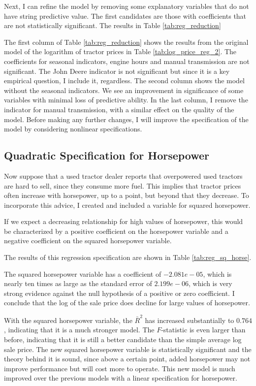Next, I can refine the model by removing some explanatory variables that do not have string predictive value.
The first candidates are those with coefficients that are not statistically significant. 
The results in Table \ref{tab:reg_reduction}



The first column of Table \ref{tab:reg_reduction}
shows the results from the original model of
the logarithm of tractor prices in Table \ref{tab:log_price_reg_2}. 
The coefficients for seasonal indicators, 
engine hours and manual transmission are not significant.
The John Deere indicator is not significant
but since it is a key empirical question, 
I include it, regardless. 
The second column shows the model without the seasonal indicators. 
We see an improvement in significance of
some variables with minimal loss of predictive ability. 
In the last column, I remove the indicator for manual transmission, with a similar effect on the quality of the model. 
Before making any further changes, 
I will improve the specification of the model
by considering nonlinear specifications. 

\clearpage
\subsection{Quadratic Specification for Horsepower}

Now suppose that 
a used tractor dealer reports that overpowered used tractors are hard to sell, since they consume more fuel. 
This implies that tractor prices often increase with horsepower, up to a point, but beyond that they decrease. 
To incorporate this advice, I created and included a variable for squared horsepower. 

If we expect a decreasing relationship for high values of horsepower, 
this would be characterized by 
a positive coefficient on the horsepower variable and
a negative coefficient on the squared horsepower variable. 

The results of this regression specification are shown in 
Table \ref{tab:reg_sq_horse}. 
% 

% 
The squared horsepower variable has a coefficient of $-2.081e-05$, which is nearly ten times as large as the standard error of $2.199e-06$, which is very strong evidence against the null hypothesis of a positive or zero coefficient. 
I conclude that the log of the sale price does decline for large values of horsepower. 


With the squared horsepower variable, the $\bar{R}^2$ has increased substantially to $0.764$, indicating that it is a much stronger model. 
The $F$-statistic is even larger than before, indicating that it is still a better candidate than the simple average log sale price. 
The new squared horsepower variable is statistically significant and the theory behind it is sound, since above a certain point, added horsepower may not improve performance but will cost more to operate. 
This new model is much improved over the previous models with a linear specification for horsepower.

